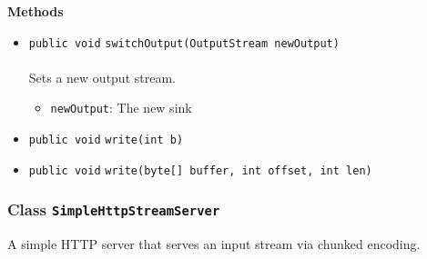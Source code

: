 \textbf{\sffamily Methods}
\begin{itemize}
\item \lstinline|public void| \lstinline|switchOutput|\lstinline|(OutputStream newOutput)|\\ \\[-0.6em]
Sets a new output stream.
\begin{itemize}
\item \lstinline|newOutput|: The new sink
\end{itemize}



\item \lstinline|public void| \lstinline|write|\lstinline|(int b)| \\[-0.6em]




\item \lstinline|public void| \lstinline|write|\lstinline|(byte[] buffer, int offset, int len)| \\[-0.6em]




\end{itemize}

\subsubsection{Class \lstinline|SimpleHttpStreamServer|}
A simple HTTP server that serves an input stream via chunked encoding. \\
\noindent\begin{minipage}[t]{5cm}
\vspace{0.3em}
\hspace*{2em}
\vspace{0.3em}
\end{minipage}



